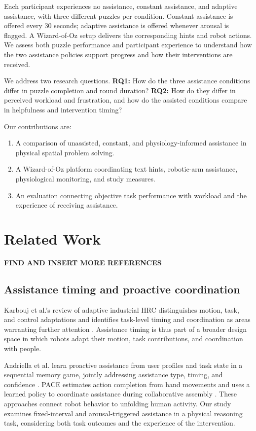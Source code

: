 \documentclass[sigconf,anonymous]{aamas}
\begin{document}
Each participant experiences no assistance, constant assistance, and adaptive assistance, with three different puzzles per condition. Constant assistance is offered every 30 seconds; adaptive assistance is offered whenever arousal is flagged. A Wizard-of-Oz setup delivers the corresponding hints and robot actions. We assess both puzzle performance and participant experience to understand how the two assistance policies support progress and how their interventions are received.

We address two research questions. \textbf{RQ1:} How do the three assistance conditions differ in puzzle completion and round duration? \textbf{RQ2:} How do they differ in perceived workload and frustration, and how do the assisted conditions compare in helpfulness and intervention timing?

Our contributions are:

\begin{enumerate}
\item A comparison of unassisted, constant, and physiology-informed assistance in physical spatial problem solving.
\item A Wizard-of-Oz platform coordinating text hints, robotic-arm assistance, physiological monitoring, and study measures.
\item An evaluation connecting objective task performance with workload and the experience of receiving assistance.
\end{enumerate}

\section{Related Work}

\textbf{FIND AND INSERT MORE REFERENCES}

\subsection{Assistance timing and proactive coordination}

Karbouj et al.'s review of adaptive industrial HRC distinguishes motion, task, and control adaptations and identifies task-level timing and coordination as areas warranting further attention \cite{karbouj2026}. Assistance timing is thus part of a broader design space in which robots adapt their motion, task contributions, and coordination with people.

Andriella et al. learn proactive assistance from user profiles and task state in a sequential memory game, jointly addressing assistance type, timing, and confidence \cite{andriella2025}. PACE estimates action completion from hand movements and uses a learned policy to coordinate assistance during collaborative assembly \cite{delazzari2025}. These approaches connect robot behavior to unfolding human activity. Our study examines fixed-interval and arousal-triggered assistance in a physical reasoning task, considering both task outcomes and the experience of the intervention.
\end{document}
